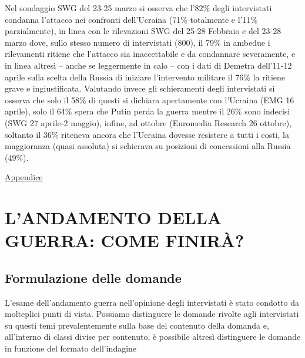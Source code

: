 \documentclass[
]{book}
\begin{document}
Nel sondaggio SWG del 23-25 marzo si osserva che l'82\% degli intervistati condanna l'attacco nei confronti dell'Ucraina (71\% totalmente e l'11\% parzialmente), in linea con le rilevazioni SWG del 25-28 Febbraio e del 23-28 marzo dove, sullo stesso numero di intervistati (800), il 79\% in ambedue i rilevamenti ritiene che l'attacco sia inaccettabile e da condannare severamente, e in linea altresì -- anche se leggermente in calo -- con i dati di Demetra dell'11-12 aprile sulla scelta della Russia di iniziare l'intervento militare il 76\% la ritiene grave e ingiustificata. Valutando invece gli schieramenti degli intervistati si osserva che solo il 58\% di questi si dichiara apertamente con l'Ucraina (EMG 16 aprile), solo il 64\% spera che Putin perda la guerra mentre il 26\% sono indecisi (SWG 27 aprile-2 maggio), infine, ad ottobre (Euromedia Research 26 ottobre), soltanto il 36\% riteneva ancora che l'Ucraina dovesse resistere a tutti i costi, la maggioranza (quasi assoluta) si schierava su posizioni di concessioni alla Russia (49\%).

\href{https://github.com/LucianaFazio/Ucrania/blob/main/III.\%20Le\%20cause\%20della\%20guerra_v.5.pdf}{Appendice}

\hypertarget{landamento-della-guerra-come-finiruxe0}{%
\chapter{L'ANDAMENTO DELLA GUERRA: COME FINIRÀ?}\label{landamento-della-guerra-come-finiruxe0}}

\hypertarget{formulazione-delle-domande-2}{%
\section{Formulazione delle domande}\label{formulazione-delle-domande-2}}

L'esame dell'andamento guerra nell'opinione degli intervistati è stato condotto da molteplici punti di vista. Possiamo distinguere le domande rivolte agli intervistati su questi temi prevalentemente sulla base del contenuto della domanda e, all'interno di classi divise per contenuto, è possibile altresì distinguere le domande in funzione del formato dell'indagine
\end{document}
